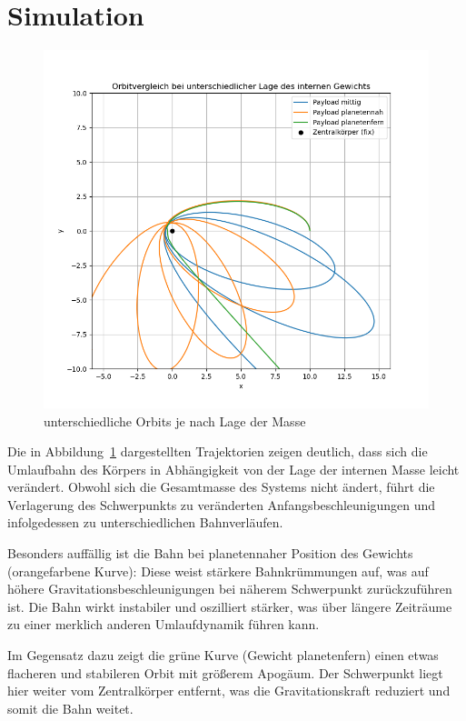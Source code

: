 \documentclass[conference]{IEEEtran}
\begin{document}
\section{Simulation}

\begin{figure}[H]
    \centering
    \includegraphics[width=\linewidth]{pics/orbits.png}
    \caption{unterschiedliche Orbits je nach Lage der Masse}
    \label{fig:orbits}
\end{figure}

Die in Abbildung~\ref{fig:orbits} dargestellten Trajektorien zeigen deutlich, dass sich die Umlaufbahn des Körpers in Abhängigkeit von der Lage der internen Masse leicht verändert. Obwohl sich die Gesamtmasse des Systems nicht ändert, führt die Verlagerung des Schwerpunkts zu veränderten Anfangsbeschleunigungen und infolgedessen zu unterschiedlichen Bahnverläufen.

Besonders auffällig ist die Bahn bei planetennaher Position des Gewichts (orangefarbene Kurve): Diese weist stärkere Bahnkrümmungen auf, was auf höhere Gravitationsbeschleunigungen bei näherem Schwerpunkt zurückzuführen ist. Die Bahn wirkt instabiler und oszilliert stärker, was über längere Zeiträume zu einer merklich anderen Umlaufdynamik führen kann.

Im Gegensatz dazu zeigt die grüne Kurve (Gewicht planetenfern) einen etwas flacheren und stabileren Orbit mit größerem Apogäum. Der Schwerpunkt liegt hier weiter vom Zentralkörper entfernt, was die Gravitationskraft reduziert und somit die Bahn weitet.
\end{document}
